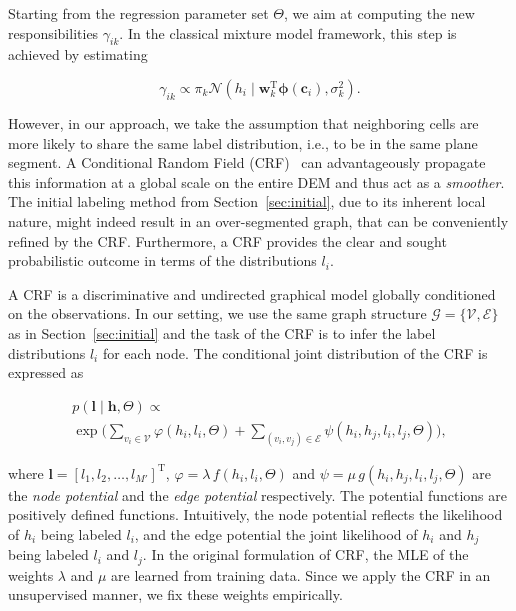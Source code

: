 Starting from the regression parameter set $\Theta$, we aim at computing the new
responsibilities $\gamma_{ik}$. In the classical mixture model framework, this
step is achieved by estimating

\begin{equation}
\label{eqn:responsibilities}
\gamma_{ik}\propto \pi_k\mathcal{N}(h_i\mid\mathbf{w}_k^\text{T}
\boldsymbol{\phi}(\mathbf{c}_i),\sigma^2_k).
\end{equation}

However, in our approach, we take the assumption that neighboring cells are more
likely to share the same label distribution, i.e., to be in the same plane
segment. A Conditional Random Field (CRF)~\cite{lafferty01conditional}
can advantageously propagate this information at a global scale on the entire
DEM and thus act as a \emph{smoother}. The initial labeling method from
Section~\ref{sec:initial}, due to its inherent local nature, might indeed result
in an over-segmented graph, that can be conveniently refined by the CRF.
Furthermore, a CRF provides the clear and sought probabilistic outcome in terms
of the distributions $l_i$.

A CRF is a discriminative and undirected graphical model globally conditioned on
the observations. In our setting, we use the same graph structure
$\mathcal{G}=\{\mathcal{V},\mathcal{E}\}$ as in Section~\ref{sec:initial} and
the task of the CRF is to infer the label distributions $l_i$ for each node. The
conditional joint distribution of the CRF is expressed as

\begin{eqnarray}
\label{eqn:crf_joint}
p(\mathbf{l}\mid\mathbf{h},\Theta)\propto
\phantom{aaaaaaaaaaaaaaaaaaaaaaaaaaaaaaaaaa}\\ \nonumber
\exp\bigg(\sum_{v_i\in\mathcal{V}}
\varphi(h_i,l_i,\Theta)+\sum_{(v_i,v_j)\in\mathcal{E}}
\psi(h_i,h_j,l_i,l_j,\Theta)\bigg),
\end{eqnarray}

where $\mathbf{l}=[l_1,l_2,\dots,l_{M'}]^\text{T}$, $\varphi=
\lambda\,f(h_i,l_i,\Theta)$ and $\psi=\mu\,g(h_i,h_j,l_i,l_j,\Theta)$ are the
\emph{node potential} and the \emph{edge potential} respectively. The potential
functions are positively defined functions. Intuitively, the node potential
reflects the likelihood of $h_i$ being labeled $l_i$, and the edge potential the
joint likelihood of $h_i$ and $h_j$ being labeled $l_i$ and $l_j$. In the
original formulation of CRF, the MLE of the weights $\lambda$ and $\mu$ are
learned from training data. Since we apply the CRF in an unsupervised manner, we
fix these weights empirically.

